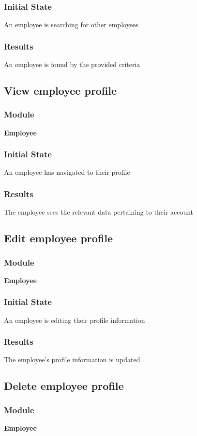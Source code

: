 \documentclass[12pt, titlepage]{article}
\begin{document}
    \subsubsection{Initial State}
    An employee is searching for other employees
    \subsubsection{Results}
    An employee is found by the provided criteria

\subsection{View employee profile}
    \subsubsection{Module}
    \textbf{Employee}
    \subsubsection{Initial State}
    An employee has navigated to their profile
    \subsubsection{Results}
    The employee sees the relevant data pertaining to their account

\subsection{Edit employee profile}
    \subsubsection{Module}
    \textbf{Employee}
    \subsubsection{Initial State}
    An employee is editing their profile information
    \subsubsection{Results}
    The employee's profile information is updated

\subsection{Delete employee profile}
    \subsubsection{Module}
    \textbf{Employee}
\end{document}
